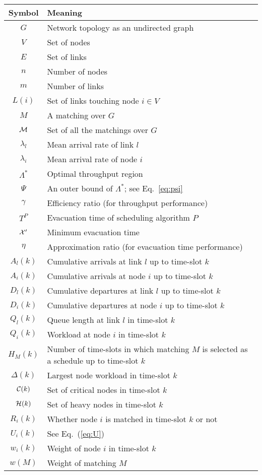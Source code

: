 \documentclass[10pt,journal,compsoc]{IEEEtran}
\newcommand{\HIGH}[1]{{\color{black}{#1}}}
\begin{document}
\begin{table}[!t]
\begin{tabular}{ c p{7cm}}
\toprule 
Symbol  & Meaning  \\
\hline 
 $G$  &  Network topology as an undirected graph       \\
 $V$  &  Set of nodes      \\
 $E$  &  Set of links     \\
 $n$  &  Number of nodes     \\
 $m$ &  Number of links     \\
 $L(i)$   &  Set of links touching node $i \in V$      \\
 $M$   & A matching over $G$ \\
 $\mathcal{M}$   & Set of all the matchings over $G$      \\
 $\lambda_l$  &   Mean arrival rate of link $l$   \\
$\lambda_i$   &  Mean arrival rate of node $i$   \\
 $\Lambda^*$   &   Optimal throughput region    \\
 $\Psi$  &   An outer bound of $\Lambda^*$; see Eq.~\eqref{eq:psi}   \\
 $\gamma$   &  Efficiency ratio (for throughput performance)      \\
 $T^P$   &   Evacuation time of scheduling algorithm $P$    \\
 $ \mathcal{X}^{\prime}$   &   Minimum evacuation time  \\
 $\eta$   &    Approximation ratio (for evacuation time performance)       \\  
 $A_l(k)$    &    Cumulative arrivals at link $l$ up to time-slot $k$    \\
 $A_i(k)$    &    Cumulative arrivals at node $i$ up to time-slot $k$  \\
 $D_l(k)$   &  Cumulative departures at link $l$ up to time-slot $k$     \\
 $D_i(k)$   &  Cumulative departures at node $i$ up to time-slot $k$   \\
 $Q_l(k)$   &    Queue length at link $l$ in time-slot $k$   \\ 
 $Q_i(k)$   &  Workload at node $i$ in time-slot $k$    \\
 $H_M(k)$   &   Number of time-slots in which matching $M$ is selected as a schedule up to time-slot $k$   \\
 $\Delta(k)$   &  Largest node workload in time-slot $k$\\
 $\mathcal{C}(k)$      &   Set of critical nodes in time-slot $k$     \\
 $\mathcal{H}(k)$  	   &   Set of heavy nodes in time-slot $k$      \\
 $R_i(k)$  &  Whether node $i$ is matched in time-slot $k$ or not      \\
 $U_i(k)$  &  See Eq.~(\ref{eq:U})     \\
 $w_i(k)$    &    Weight of node $i$ in time-slot $k$   \\
$w(M)$ & Weight of matching $M$   \\
\hline
\end{tabular}
\caption{\HIGH{Summary of notations.}}\label{tab:sys}
\label{tab:notations}
\end{table}
\end{document}
